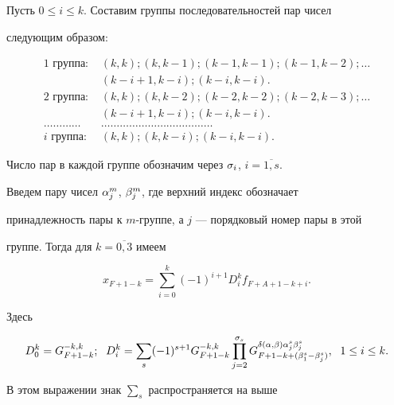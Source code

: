 Пусть $0\leq i\leq k$. Составим группы последовательностей пар чисел


следующим образом:


\begin{align*}


\text{1 группа: } &(k,k);(k,k-1);(k-1,k-1);(k-1,k-2);\dotsc\\


&(k-i+1,k-i);(k-i,k-i).\\


\text{2 группа: } &(k,k);(k,k-2);(k-2,k-2);(k-2,k-3);\dotsc \\


& (k-i+1,k-i);(k-i,k-i).\\


\dots\dotsc\dotsc\dotsc &


\dots\dotsc\dotsc\dots\dotsc\dotsc\dots\dotsc\dotsc\dots\dotsc\dotsc \\


\text{$i$ группа: } &(k,k);(k,k-i);(k-i,k-i).


\end{align*}


Число пар в каждой группе обозначим через $\sigma_{i}$, $i=\overline{1,s}$.





Введем пару чисел $\alpha_{j}^{m}$, $\beta_{j}^{m}$, где верхний индекс обозначает


принадлежность пары к $m$-группе, а $j$ --- порядковый номер пары в этой


группе. Тогда для $k=\overline{0,3}$ имеем


\begin{equation}


x_{F+1-k}=\sum_{i=0}^{k}(-1)^{i+1}D_{i}^{k}f_{F+A+1-k+i}.


\end{equation}


Здесь


\begin{equation}


D_{0}^{k}=G_{F+1-k}^{-k,k};\ \;


D_{i}^{k}=\sum_{s}(-1)^{s+1}G_{F+1-k}^{-k,k}\prod_{j=2}^


{\s_{s}}G_{F+1-k+(\b_{1}^{s}-\b_{j}^{s})}


^{\d (\a,\b)\a_{j}^{s}\b_{j}^{s}},\ \;1\leq i\leq k.


\end{equation}


В этом выражении знак $\sum\limits_{s}$ распространяется на выше


